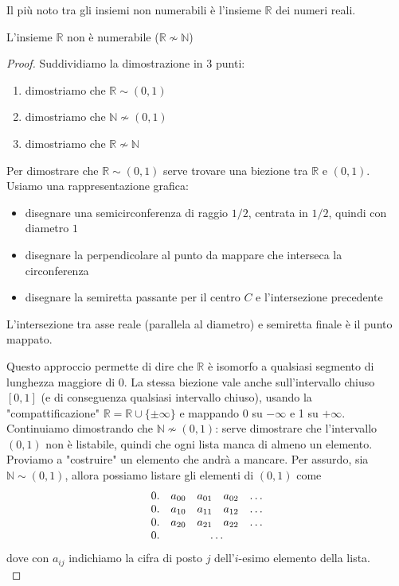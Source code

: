 Il più noto tra gli insiemi non numerabili è l'insieme $\mathbb{R}$ dei numeri reali.\\

\begin{theor}
	L'insieme $\mathbb{R}$ non è numerabile ($\mathbb{R} \nsim \mathbb{N}$)
\end{theor}
\begin{proof}
	Suddividiamo la dimostrazione in 3 punti: 
	\begin{enumerate}
		\item dimostriamo che $\mathbb{R} \sim (0,1)$
		\item dimostriamo che $\mathbb{N} \nsim (0,1)$
		\item dimostriamo che $\mathbb{R} \nsim \mathbb{N}$
	\end{enumerate}
	
	Per dimostrare che $\mathbb{R} \sim (0,1)$ serve trovare una biezione tra $\mathbb{R}$ e $(0,1)$. Usiamo una rappresentazione grafica: 
	\begin{itemize}
		\item disegnare una semicirconferenza di raggio $1/2$, centrata in $1/2$, quindi con diametro $1$
		\item disegnare la perpendicolare al punto da mappare che interseca la circonferenza
		\item disegnare la semiretta passante per il centro $C$ e l'intersezione precedente
	\end{itemize}
	L'intersezione tra asse reale (parallela al diametro) e semiretta finale è il punto mappato. 
	
	\begin{center}
		
	\end{center}
	
	Questo approccio permette di dire che $\mathbb{R}$ è isomorfo a qualsiasi segmento di lunghezza maggiore di $0$. La stessa biezione vale anche sull'intervallo chiuso $[0,1]$ (e di conseguenza qualsiasi intervallo chiuso), usando la "compattificazione" $\mathbb{R} = \mathbb{R} \cup \{\pm \infty\}$ e mappando $0$ su $-\infty$ e 1 su $+ \infty$.\\
	
	Continuiamo dimostrando che $\mathbb{N} \nsim (0,1)$: serve dimostrare che l'intervallo $(0,1)$ non è listabile, quindi che ogni lista manca di almeno un elemento. Proviamo a "costruire" un elemento che andrà a mancare. Per assurdo, sia $\mathbb{N} \sim (0,1)$, allora possiamo listare gli elementi di $(0,1)$ come 
	$$ 
	\begin{array}{c c c c c}
		0. & a_{00} & a_{01} & a_{02} & \dots \\
		0. & a_{10} & a_{11} & a_{12} & \dots \\
		0. & a_{20} & a_{21} & a_{22} & \dots \\
		0. & \multicolumn{4}{c}{\dots}
	\end{array}
	$$
	dove con $a_{ij}$ indichiamo la cifra di posto $j$ dell'$i$-esimo elemento della lista.\\
	

\end{proof}
